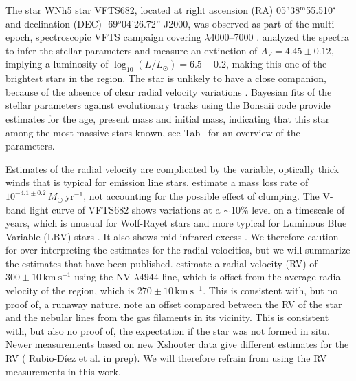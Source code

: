 \documentclass[apjl,twocolumn]{emulateapj}
\newcommand{\kms}{{\,\mathrm{km\ s^{-1}}}}
\begin{document}
The star WNh5 star VFTS682, located at right ascension (RA)
05$^\mathrm{h}$38$^\mathrm{m}$55.510$^\mathrm{s}$  and declination
(DEC) \mbox{-69$^\mathrm{o}$04'26.72''} J2000, was observed as part of the multi-epoch, spectroscopic VFTS campaign covering $\lambda$4000--7000 \citep[][]{evans:11}. 
%
%
\citet{bestenlehner:11}  analyzed the spectra to infer the stellar parameters and measure an extinction of $A_V=4.45\pm0.12$, implying a luminosity of $\log_{10}(L/L_\odot) =  6.5\pm0.2$, making this one of the brightest stars in the region. The star is unlikely to have a close companion, because of the absence of clear radial velocity variations \citet{bestenlehner:11}.  Bayesian fits of the stellar parameters against evolutionary tracks \citep{brott:11, kohler:15} using the Bonsaii code \citep{schneider:17, schneider:18} provide estimates for the age, present mass and initial mass, indicating that this star among the most massive stars known, see Tab~ \label{tab:vfts682} for an overview of the parameters.

Estimates of the radial velocity are complicated by the variable, optically thick winds that is typical for emission line stars. \citet{bestenlehner:11} estimate a mass loss rate of $10^{-4.1\pm0.2}\,M_\odot \ \mathrm{yr}^{-1}$, not accounting for the possible effect of clumping.  The V-band light curve of VFTS682  shows variations at a $\sim$10\% level on a timescale of years, which is unusual for Wolf-Rayet stars and more typical for Luminous Blue Variable (LBV) stars \citep{udalski:08, bestenlehner:11}. It also shows mid-infrared excess \citep{gruendl:09}.  We therefore caution for over-interpreting the estimates for the radial velocities, but we will summarize the estimates that have been published.  \citet{bestenlehner:11}  estimate a radial velocity (RV) of  $300\pm10\kms$ using the  N{\footnotesize V} $\lambda4944$ line, which is offset from the average radial velocity of the region, which is  $270\pm10\kms$. This is consistent with, but no proof of, a runaway nature.  \cite{bressert:12} note an offset compared between the RV of the star and the nebular lines from the gas filaments in its vicinity. This is consistent with, but also no proof of, the expectation if the star was not formed in situ.  Newer measurements based on new Xshooter data give different estimates for the RV ({\color{blue} Rubio-D{\' i}ez et al. in prep}). We will therefore refrain from using the RV measurements in this work. 
\end{document}
